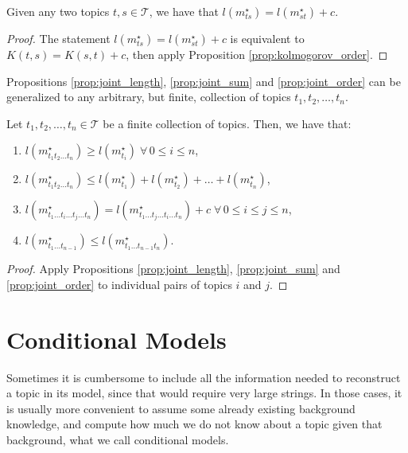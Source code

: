 \begin{proposition}
\label{prop:joint_order}
Given any two topics $t,s \in \mathcal{T}$, we have that $l \left( m_{ts}^{\star} \right) = l \left( m_{st}^{\star} \right) + c$.
\end{proposition}
\begin{proof}
The statement $l \left( m_{ts}^{\star} \right) = l \left( m_{st}^{\star} \right) + c$ is equivalent to $K(t,s) = K(s,t) + c$, then apply Proposition \ref{prop:kolmogorov_order}.
\end{proof}

Propositions \ref{prop:joint_length}, \ref{prop:joint_sum} and \ref{prop:joint_order} can be generalized to any arbitrary, but finite, collection of topics $t_1, t_2, \ldots, t_n$.

\begin{proposition}
\label{prop:joint_multiple_topics}
Let $t_1, t_2, \ldots, t_n \in \mathcal{T}$ be a finite collection of topics. Then, we have that:

\renewcommand{\theenumi}{\roman{enumi}}
\begin{enumerate}
\item $l(m_{t_1 t_2 \ldots t_n}^\star) \geq l(m_ {t_i}^\star) \; \forall \, 0 \leq i \leq n$,
\item $l(m_{t_1 t_2 \ldots t_n}^\star) \leq l(m_ {t_1}^\star) + l(m_ {t_2}^\star) + \ldots + l(m_ {t_n}^\star)$,
\item $l(m_{t_1 \ldots t_i \ldots t_j \ldots t_n}^\star) = l(m_{t_1 \ldots t_j \ldots t_i \ldots t_n}^\star) + c \; \forall \, 0 \leq i \leq j \leq n$,
\item $l(m_{t_1 \ldots t_{n-1}}^\star) \leq l(m_{t_1 \ldots t_{n-1} t_n}^\star)$.
\end{enumerate}
\end{proposition}
\begin{proof}
Apply Propositions \ref{prop:joint_length}, \ref{prop:joint_sum} and \ref{prop:joint_order} to individual pairs of topics $i$ and $j$.
\end{proof}

%
%

\section{Conditional Models}

Sometimes it is cumbersome to include all the information needed to reconstruct a topic in its model, since that would require very large strings. In those cases, it is usually more convenient to assume some already existing background knowledge, and compute how much we do not know about a topic given that background, what we call conditional models.

